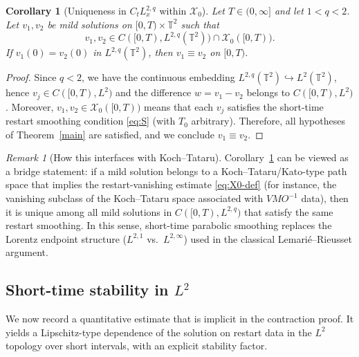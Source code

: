 \documentclass[12pt]{article}
\newcommand{\T}{\mathbb{T}}
\newtheorem{corollary}[theorem]{Corollary}
\theoremstyle{remark}
\newtheorem{remark}[theorem]{Remark}
\theoremstyle{remark}
\begin{document}
\begin{corollary}[Uniqueness in $C_tL_x^{2,q}$ within $\mathcal{X}_0$]\label{cor:A}
Let $T\in(0,\infty]$ and let $1<q<2$. Let $v_1,v_2$ be mild solutions on $[0,T)\times\T^2$
such that
\[
v_1,v_2\in C([0,T),L^{2,q}(\T^2))\cap \mathcal{X}_0([0,T)).
\]
If $v_1(0)=v_2(0)$ in $L^{2,q}(\T^2)$, then $v_1\equiv v_2$ on $[0,T)$.
\end{corollary}

\begin{proof}
Since $q<2$, we have the continuous embedding $L^{2,q}(\T^2)\hookrightarrow L^2(\T^2)$,
hence $v_j\in C([0,T),L^2)$ and the difference $w=v_1-v_2$ belongs to $C([0,T),L^2)$.
Moreover, $v_1,v_2\in \mathcal{X}_0([0,T))$ means that each $v_j$ satisfies the short-time
restart smoothing condition \eqref{eq:S} (with $T_0$ arbitrary). Therefore, all hypotheses
of Theorem~\ref{main} are satisfied, and we conclude $v_1\equiv v_2$.
\end{proof}

\begin{remark}[How this interfaces with Koch--Tataru]\label{rem:KT-interface}
Corollary~\ref{cor:A} can be viewed as a bridge statement:
if a mild solution belongs to a Koch--Tataru/Kato-type path space that implies
the restart-vanishing estimate \eqref{eq:X0-def} (for instance, the vanishing
subclass of the Koch--Tataru space associated with $VMO^{-1}$ data),
then it is unique among all mild solutions in $C([0,T),L^{2,q})$ that satisfy the same
restart smoothing. In this sense, short-time parabolic smoothing replaces the Lorentz
endpoint structure ($L^{2,1}$ vs.\ $L^{2,\infty}$) used in the classical Lemari\'e--Rieusset
argument.
\end{remark}


\subsection{Short-time stability in $L^2$}

We now record a quantitative estimate that is implicit in the contraction proof.
It yields a Lipschitz-type dependence of the solution on restart data in the $L^2$ topology
over short intervals, with an explicit stability factor.
\end{document}
